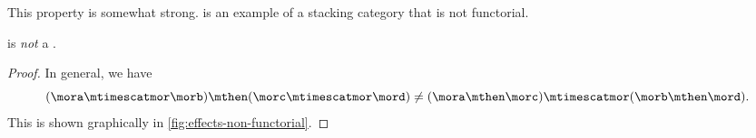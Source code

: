 This property is somewhat strong.
\Effects is an example of a stacking category that is not functorial.

\begin{lemma}
    \label{lem:effects-not-functorial}
    \Effects is \emph{not} a .
\end{lemma}

\begin{proof}
    In general, we have
    \begin{equation}
        (\mora \mtimescatmor \morb )
        \mthen (\morc \mtimescatmor \mord )
        \neq
        (\mora \mthen \morc ) \mtimescatmor (\morb \mthen \mord ).
    \end{equation}
    This is shown graphically in \cref{fig:effects-non-functorial}.
\end{proof}

\begin{figure*}[h]
    \centering
    \hfill
    \hfill
    \hfill
    \caption{Proof that \Effects is not a  category by showing that
        the two morphisms above have different representations in~\SetL.}
    \label{fig:effects-non-functorial}
\end{figure*}



